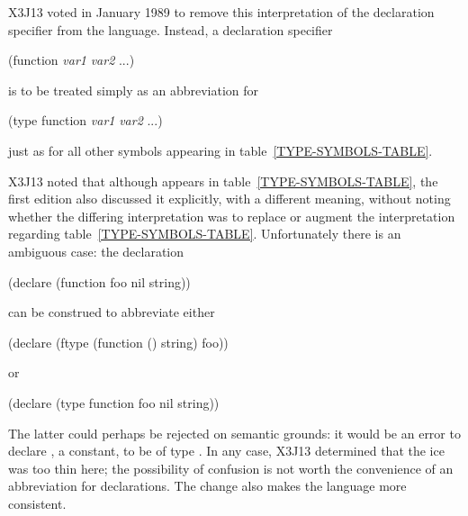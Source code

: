 \begin{new}
X3J13 voted in January 1989
to remove this interpretation
of the  declaration specifier from the language.
Instead, a declaration specifier
\begin{lisp}
(function \emph{var1} \emph{var2} ...)
\end{lisp}
is to be treated simply as an abbreviation for
\begin{lisp}
(type function \emph{var1} \emph{var2} ...)
\end{lisp}
just as for all other symbols appearing in table~\ref{TYPE-SYMBOLS-TABLE}.

X3J13 noted that although  appears in
table~\ref{TYPE-SYMBOLS-TABLE}, the first edition also discussed it
explicitly, with a different meaning,
without noting whether the differing
interpretation was to replace or augment the
interpretation regarding table~\ref{TYPE-SYMBOLS-TABLE}.  Unfortunately
there is an ambiguous case: the declaration
\begin{lisp}
(declare (function foo nil string))
\end{lisp}
can be construed to abbreviate either
\begin{lisp}
(declare (ftype (function () string) foo))
\end{lisp}
or
\begin{lisp}
(declare (type function foo nil string))
\end{lisp}
The latter could perhaps be rejected on semantic grounds: it would be an
error to declare , a constant, to be of type .
In any case, X3J13 determined that the ice was too thin here;
the possibility of confusion is not worth the convenience of
an abbreviation for  declarations.
The change also makes the language more consistent.
\end{new}

